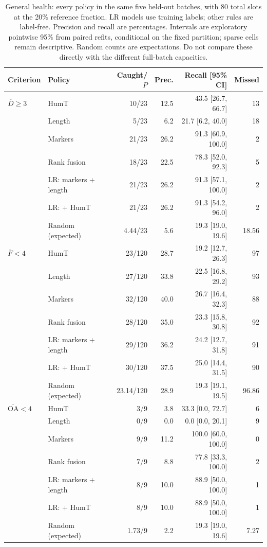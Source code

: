 \begin{table}[htbp]
\centering\small
\caption{General health: every policy in the same five held-out batches, with 80 total slots at the 20\% reference fraction. LR models use training labels; other rules are label-free. Precision and recall are percentages. Intervals are exploratory pointwise 95\% from paired refits, conditional on the fixed partition; sparse cells remain descriptive. Random counts are expectations. Do not compare these directly with the different full-batch capacities.}
\label{tab:held_health}
\begin{tabular}{llrrrr}
\toprule
Criterion & Policy & Caught/$P$ & Prec. & Recall [95\% CI] & Missed \\
\midrule
$\overline D\geq3$ & HumT & 10/23 & 12.5 & 43.5 [26.7, 66.7] & 13 \\
 & Length & 5/23 & 6.2 & 21.7 [6.2, 40.0] & 18 \\
 & Markers & 21/23 & 26.2 & 91.3 [60.9, 100.0] & 2 \\
 & Rank fusion & 18/23 & 22.5 & 78.3 [52.0, 92.3] & 5 \\
 & LR: markers + length & 21/23 & 26.2 & 91.3 [57.1, 100.0] & 2 \\
 & LR: + HumT & 21/23 & 26.2 & 91.3 [54.2, 96.0] & 2 \\
 & Random (expected) & 4.44/23 & 5.6 & 19.3 [19.0, 19.6] & 18.56 \\
$\overline F<4$ & HumT & 23/120 & 28.7 & 19.2 [12.7, 26.3] & 97 \\
 & Length & 27/120 & 33.8 & 22.5 [16.8, 29.2] & 93 \\
 & Markers & 32/120 & 40.0 & 26.7 [16.4, 32.3] & 88 \\
 & Rank fusion & 28/120 & 35.0 & 23.3 [15.8, 30.8] & 92 \\
 & LR: markers + length & 29/120 & 36.2 & 24.2 [12.7, 31.8] & 91 \\
 & LR: + HumT & 30/120 & 37.5 & 25.0 [14.4, 31.5] & 90 \\
 & Random (expected) & 23.14/120 & 28.9 & 19.3 [19.1, 19.5] & 96.86 \\
$\overline{\mathrm{OA}}<4$ & HumT & 3/9 & 3.8 & 33.3 [0.0, 72.7] & 6 \\
 & Length & 0/9 & 0.0 & 0.0 [0.0, 20.1] & 9 \\
 & Markers & 9/9 & 11.2 & 100.0 [60.0, 100.0] & 0 \\
 & Rank fusion & 7/9 & 8.8 & 77.8 [33.3, 100.0] & 2 \\
 & LR: markers + length & 8/9 & 10.0 & 88.9 [50.0, 100.0] & 1 \\
 & LR: + HumT & 8/9 & 10.0 & 88.9 [50.0, 100.0] & 1 \\
 & Random (expected) & 1.73/9 & 2.2 & 19.3 [19.0, 19.6] & 7.27 \\
\bottomrule
\end{tabular}
\end{table}

